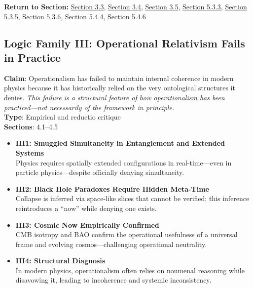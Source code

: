 \documentclass[12pt]{book}
\begin{document}
\textbf{Return to Section:} \hyperref[sec:3.3]{Section 3.3}, \hyperref[sec:3.4]{Section 3.4}, \hyperref[sec:3.5]{Section 3.5}, \hyperref[sec:5.3.3]{Section 5.3.3}, \hyperref[sec:5.3.5]{Section 5.3.5}, \hyperref[sec:5.3.6]{Section 5.3.6}, \hyperref[sec:5.4.4]{Section 5.4.4}, \hyperref[sec:5.4.6]{Section 5.4.6}

\vspace{1em}

\subsection*{Logic Family III: Operational Relativism Fails in Practice}
\textbf{Claim}: Operationalism has failed to maintain internal coherence in modern physics because it has historically relied on the very ontological structures it denies. \textit{This failure is a structural feature of how operationalism has been practiced---not necessarily of the framework in principle.}\\
\textbf{Type}: Empirical and reductio critique\\
\textbf{Sections}: 4.1–4.5
\begin{itemize}
  \item \textbf{III1: Smuggled Simultaneity in Entanglement and Extended Systems} \\
  Physics requires spatially extended configurations in real-time---even in particle physics---despite officially denying simultaneity.
  \item \textbf{III2: Black Hole Paradoxes Require Hidden Meta-Time} \\
  Collapse is inferred via space-like slices that cannot be verified; this inference reintroduces a ``now'' while denying one exists.
  \item \textbf{III3: Cosmic Now Empirically Confirmed} \\
  CMB isotropy and BAO confirm the operational usefulness of a universal frame and evolving cosmos---challenging operational neutrality.
  \item \textbf{III4: Structural Diagnosis} \\
  In modern physics, operationalism often relies on noumenal reasoning while disavowing it, leading to incoherence and systemic inconsistency.
\end{itemize}
\end{document}
